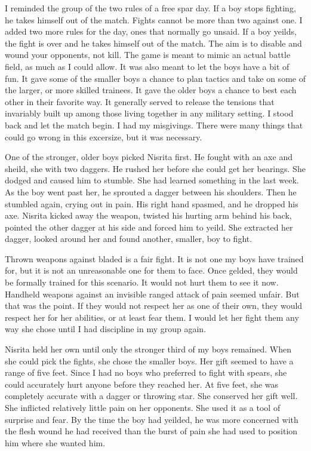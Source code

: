 \documentclass{article}
\begin{document}
I reminded the group of the two rules of a free spar day. If a boy stops fighting, he takes himself out of the match. Fights cannot be more than two against one. I added two more rules for the day, ones that normally go unsaid. If a boy yeilds, the fight is over and he takes himself out of the match. The aim is to disable and wound your opponents, not kill. The game is meant to mimic an actual battle field, as much as I could allow. It was also meant to let the boys have a bit of fun. It gave some of the smaller boys a chance to plan tactics and take on some of the larger, or more skilled trainees. It gave the older boys a chance to best each other in their favorite way. It generally served to release the tensions that invariably built up among those living together in any military setting. I stood back and let the match begin. I had my misgivings. There were many things that could go wrong in this excersize, but it was necessary.

One of the stronger, older boys picked Nisrita first. He fought with an axe and sheild, she with two daggers. He rushed her before she could get her bearings. She dodged and caused him to stumble. She had learned something in the last week. As the boy went past her, he sprouted a dagger between his shoulders. Then he stumbled again, crying out in pain. His right hand spasmed, and he dropped his axe. Nisrita kicked away the weapon, twisted his hurting arm behind his back, pointed the other dagger at his side and forced him to yeild. She extracted her dagger, looked around her and found another, smaller, boy to fight.

Thrown weapons against bladed is a fair fight. It is not one my boys have trained for, but it is not an unreasonable one for them to face. Once gelded, they would be formally trained for this scenario. It would not hurt them to see it now. Handheld weapons against an invisible ranged attack of pain seemed unfair. But that was the point. If they would not respect her as one of their own, they would respect her for her abilities, or at least fear them. I would let her fight them any way she chose until I had discipline in my group again.

Nisrita held her own until only the stronger third of my boys remained. When she could pick the fights, she chose the smaller boys. Her gift seemed to have a range of five feet. Since I had no boys who preferred to fight with spears, she could accurately hurt anyone before they reached her. At five feet, she was completely accurate with a dagger or throwing star. She conserved her gift well. She inflicted relatively little pain on her opponents. She used it as a tool of surprise and fear. By the time the boy had yeilded, he was more concerned with the flesh wound he had received than the burst of pain she had used to position him where she wanted him. 
\end{document}
